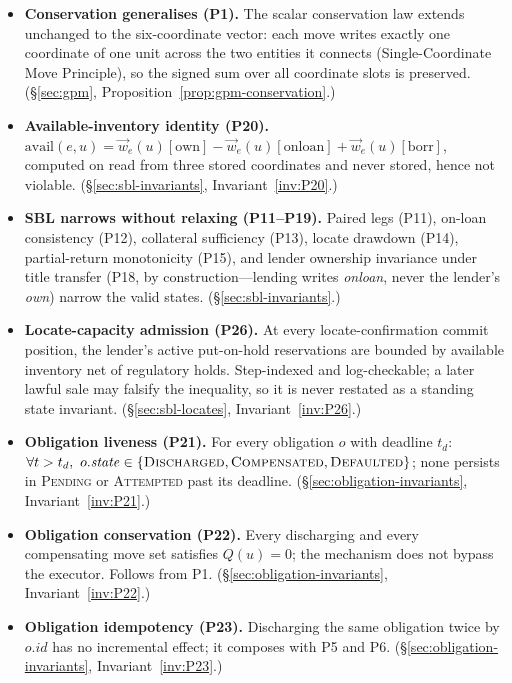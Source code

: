 \begin{itemize}[nosep]
\item \textbf{Conservation generalises (P1).} The scalar conservation law extends unchanged
to the six-coordinate vector: each move writes exactly one coordinate of one unit across the
two entities it connects (Single-Coordinate Move Principle), so the signed sum over all
coordinate slots is preserved. (\S\ref{sec:gpm}, Proposition~\ref{prop:gpm-conservation}.)
\item \textbf{Available-inventory identity (P20).}
$\mathrm{avail}(e,u)=\vec w_e(u)[\mathrm{own}]-\vec w_e(u)[\mathrm{onloan}]+\vec
w_e(u)[\mathrm{borr}]$, computed on read from three stored coordinates and never stored,
hence not violable. (\S\ref{sec:sbl-invariants}, Invariant~\ref{inv:P20}.)
\item \textbf{SBL narrows without relaxing (P11--P19).} Paired legs (P11), on-loan
consistency (P12), collateral sufficiency (P13), locate drawdown (P14), partial-return
monotonicity (P15), and lender ownership invariance under title transfer (P18, by
construction---lending writes \emph{onloan}, never the lender's \emph{own}) narrow the
valid states. (\S\ref{sec:sbl-invariants}.)
\item \textbf{Locate-capacity admission (P26).} At every locate-confirmation commit
position, the lender's active put-on-hold reservations are bounded by available inventory
net of regulatory holds. Step-indexed and log-checkable; a later lawful sale may falsify
the inequality, so it is never restated as a standing state invariant.
(\S\ref{sec:sbl-locates}, Invariant~\ref{inv:P26}.)
\item \textbf{Obligation liveness (P21).} For every obligation $o$ with deadline $t_d$:
$\forall t>t_d,\ o.\mathit{state}\in\{\textsc{Discharged},\textsc{Compensated},\textsc{Defaulted}\}$;
none persists in \textsc{Pending} or \textsc{Attempted} past its deadline.
(\S\ref{sec:obligation-invariants}, Invariant~\ref{inv:P21}.)
\item \textbf{Obligation conservation (P22).} Every discharging and every compensating move
set satisfies $Q(u)=0$; the mechanism does not bypass the executor. Follows from P1.
(\S\ref{sec:obligation-invariants}, Invariant~\ref{inv:P22}.)
\item \textbf{Obligation idempotency (P23).} Discharging the same obligation twice by
$o.\mathit{id}$ has no incremental effect; it composes with P5 and P6.
(\S\ref{sec:obligation-invariants}, Invariant~\ref{inv:P23}.)
\end{itemize}


